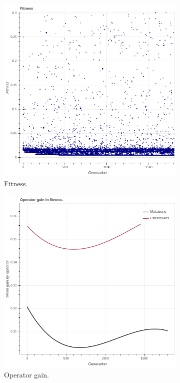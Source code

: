  \begin{figure}
    \begin{subfigure}{0.6\textwidth}
        \includegraphics[width=0.8\linewidth]{figures/incrementalfitness30.png}
        \caption{Fitness.}
    \end{subfigure}
    \begin{subfigure}{0.6\textwidth}
        \includegraphics[width=0.8\linewidth]{figures/incrementaloperatorgain30.png}
        \caption{Operator gain.}
    \end{subfigure}
        \begin{subfigure}{0.6\textwidth}

\end{subfigure}
\end{figure}
